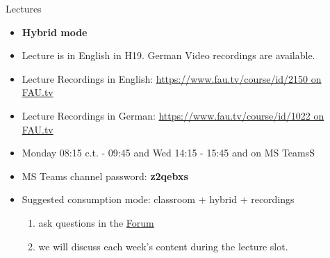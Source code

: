 \begin{frame}[c]{Lectures}
	\begin{itemize}
		\setlength\itemsep{0.4cm}
		\item \textbf{Hybrid mode}
		\item Lecture is in English in H19. German Video recordings are available. 
		\item Lecture Recordings in English: \href{https://www.fau.tv/course/id/2150}{https://www.fau.tv/course/id/2150 on FAU.tv}
		\item Lecture Recordings in German: \href{https://www.fau.tv/course/id/1022}{https://www.fau.tv/course/id/1022 on FAU.tv}
		\item Monday 08:15 c.t. - 09:45 and Wed 14:15 - 15:45 and on MS TeamsS
		\item MS Teams channel password: \textbf{z2qebxs}
		\item Suggested consumption mode: classroom + hybrid + recordings
		\begin{enumerate}
			\item ask questions in the \href{https://www.studon.fau.de/studon/goto.php?target=frm_4685856}{Forum}
			\item we will discuss each week's content during the lecture slot.
		\end{enumerate}
	\end{itemize}
\end{frame}

